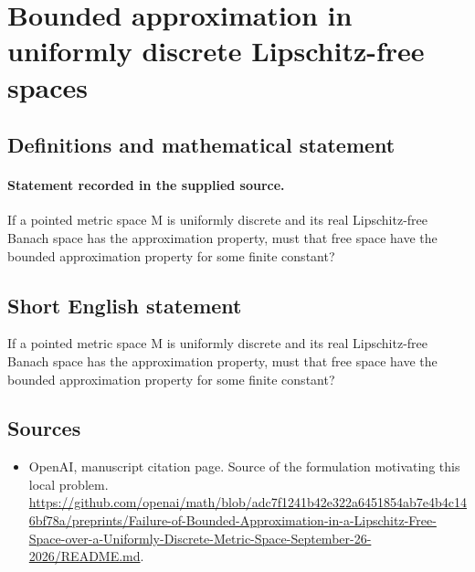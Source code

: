 \documentclass[11pt]{article}
\begin{document}
\section*{Bounded approximation in uniformly discrete Lipschitz-free spaces}\label{statement}
\subsection{Definitions and mathematical statement}
\paragraph{Statement recorded in the supplied source.}
If a pointed metric space M is uniformly discrete and its real Lipschitz-free Banach space has the approximation property, must that free space have the bounded approximation property for some finite constant?
\subsection{Short English statement}
If a pointed metric space M is uniformly discrete and its real Lipschitz-free Banach space has the approximation property, must that free space have the bounded approximation property for some finite constant?
\subsection{Sources}
\begin{itemize}
\item[S1] OpenAI, manuscript citation page. Source of the formulation motivating this local problem.
\url{https://github.com/openai/math/blob/adc7f1241b42e322a6451854ab7e4b4c146bf78a/preprints/Failure-of-Bounded-Approximation-in-a-Lipschitz-Free-Space-over-a-Uniformly-Discrete-Metric-Space-September-26-2026/README.md}.
\end{itemize}
\end{document}
